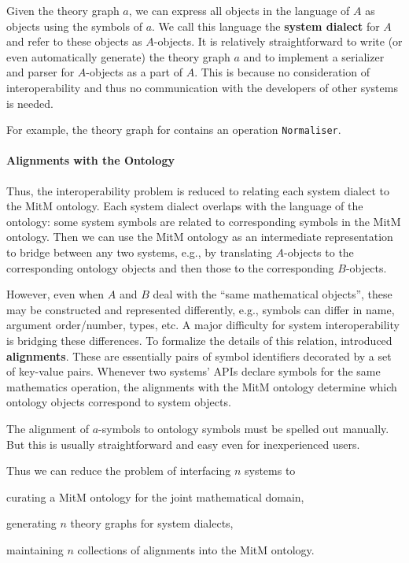 Given the theory graph $a$, we can express all objects in the language of $A$ as
\OMMT objects using the symbols of $a$. We call this language the \textbf{\OMMT
system dialect} for $A$ and refer to these objects as $A$-objects. It is
relatively straightforward to write (or even automatically generate) the theory
graph $a$ and to implement a serializer and parser for $A$-objects as a part of
$A$. This is because no consideration of interoperability and thus no
communication with the developers of other systems is needed.

For example, the theory graph for \GAP contains an operation
\lstinline|Normaliser|.


\paragraph{Alignments with the Ontology}
Thus, the interoperability problem is reduced to relating each system dialect to
the MitM ontology. Each system dialect overlaps with the language of the
ontology: some system symbols are related to corresponding symbols in the MitM
ontology. Then we can use the MitM ontology as an intermediate representation to
bridge between any two systems, e.g., by translating $A$-objects to the
corresponding ontology objects and then those to the corresponding $B$-objects.

However, even when $A$ and $B$ deal with the ``same mathematical objects'', these may be constructed and represented differently, e.g., symbols can differ in name,
argument order/number, types, etc.
A major difficulty for system interoperability is bridging these differences.
To formalize the details of this relation, \cite{MueGauKal:cacfms17} introduced \textbf{\OMMT alignments}.
These are essentially pairs of \OMMT symbol identifiers decorated by a set of key-value pairs.
Whenever two systems' APIs declare symbols for the same mathematics operation, the alignments with the MitM ontology determine which ontology objects correspond to system objects.

The alignment of $a$-symbols to ontology symbols must be spelled out manually.
But this is usually straightforward and easy even for inexperienced users.

Thus we can reduce the problem of interfacing $n$ systems to
\begin{inparaenum}[\em i\rm)]
\item curating a MitM ontology for the joint mathematical domain,
\item generating $n$ theory graphs for system dialects,
\item maintaining $n$ collections of alignments into the MitM ontology.
\end{inparaenum}

